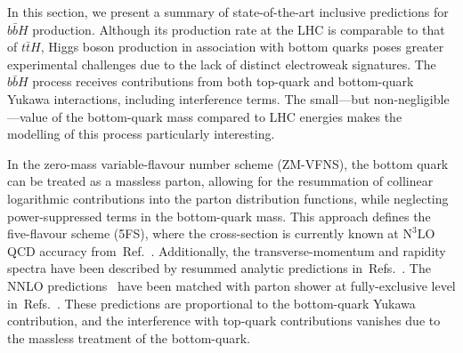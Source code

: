 \newcommand{\bbH}{$b\bar{b}H$}
\newcommand{\citere}[1]{Ref.~\cite{#1}}
\newcommand{\citeres}[1]{Refs.~\cite{#1}}
\newcommand{\tab}[1]{Table \ref{#1}}
\newcommand{\nnnlo}{$\text{N}^3\text{LO}$}
\newcommand{\noun}[1]{{\scshape #1}}
\newcommand{\minnlo}{{\noun{MiNNLO$_{\textrm{PS}}$}}}
\newcommand{\nlonnllpart}{NLO+NNLL\textsubscript{part}+$y_by_t$}


In this section, we present a summary of state-of-the-art inclusive predictions for \bbH{} production. Although its production rate at the LHC is comparable to that of $t\bar{t}H$, Higgs boson production in association with bottom quarks poses greater experimental challenges due to the lack of distinct electroweak signatures. The \bbH{} process receives contributions from both top-quark and bottom-quark Yukawa interactions, including interference terms. The small—but non-negligible—value of the bottom-quark mass compared to LHC energies makes the modelling of this process particularly interesting.

In the zero-mass variable-flavour number scheme (ZM-VFNS), the bottom quark can be treated as a massless parton, allowing for the resummation of collinear logarithmic contributions into the parton distribution functions, while neglecting power-suppressed terms in the bottom-quark mass. This approach defines the five-flavour scheme (5FS), where the cross-section is currently known at \nnnlo{} QCD accuracy from~\citere{Duhr:2019kwi}. Additionally, the transverse-momentum and rapidity spectra have been described by resummed analytic predictions in~\citeres{Cal:2023mib,Das:2024pac}. The NNLO predictions~\cite{Harlander:2003ai} have been matched with parton shower at fully-exclusive level in~\citeres{Biello:2024vdh,Gavardi:2025zpf}. These predictions are proportional to the bottom-quark Yukawa contribution, and the interference with top-quark contributions vanishes due to the massless treatment of the bottom-quark.

